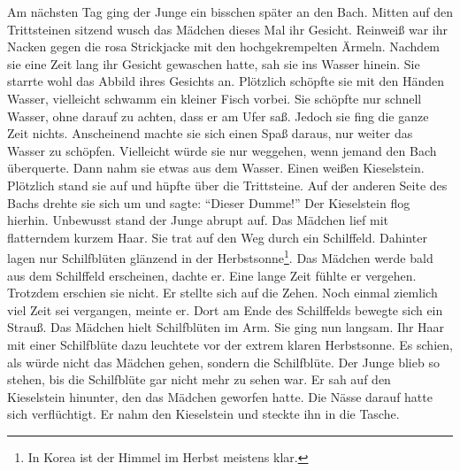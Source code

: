 \documentclass[prd,12pt,tightenlines,notitlepage,nofootinbib]{revtex4-1}
\begin{document}
Am nächsten Tag ging der Junge ein bisschen später an den Bach.
Mitten auf den Trittsteinen sitzend wusch das Mädchen dieses Mal ihr
Gesicht.  Reinweiß war ihr Nacken gegen die rosa
Strickjacke mit den hochgekrempelten Ärmeln.  Nachdem sie eine Zeit lang
ihr Gesicht gewaschen hatte, sah sie ins Wasser hinein.  Sie starrte wohl das
Abbild ihres Gesichts an.  Plötzlich schöpfte sie mit den Händen
Wasser, vielleicht schwamm ein kleiner Fisch vorbei.  Sie schöpfte nur schnell
Wasser, ohne darauf zu achten, dass er am Ufer saß.  Jedoch sie fing
die ganze Zeit nichts.  Anscheinend machte sie sich einen Spaß daraus,
nur weiter das Wasser zu schöpfen.  Vielleicht würde sie nur weggehen,
wenn jemand den Bach überquerte.  Dann nahm sie etwas aus dem Wasser.
Einen weißen Kieselstein.  Plötzlich stand sie auf und hüpfte über die
Trittsteine.  Auf der anderen Seite des Bachs drehte sie sich um und
sagte: "`Dieser Dumme!"'  Der Kieselstein flog hierhin.  Unbewusst stand
der Junge abrupt auf.  Das Mädchen lief mit flatterndem kurzem
Haar.  Sie trat auf den Weg durch ein Schilffeld.  Dahinter lagen nur
Schilfblüten glänzend in der Herbstsonne\footnote{In Korea ist
der Himmel im Herbst meistens klar.}.
Das Mädchen werde bald aus dem
Schilffeld erscheinen, dachte er.  Eine lange Zeit fühlte er vergehen.
Trotzdem erschien sie nicht.  Er stellte sich auf die Zehen.  Noch einmal
ziemlich viel Zeit sei vergangen, meinte er.  Dort am Ende des
Schilffelds bewegte sich ein Strauß.  Das Mädchen hielt Schilfblüten
im Arm.  Sie ging nun langsam.  Ihr Haar mit einer Schilfblüte dazu
leuchtete vor der extrem klaren Herbstsonne.  Es schien, als würde
nicht das Mädchen gehen, sondern die Schilfblüte.  Der Junge blieb
so stehen, bis die Schilfblüte gar nicht mehr zu sehen war.  Er sah
auf den Kieselstein hinunter, den das Mädchen geworfen hatte.  Die Nässe darauf
hatte sich verflüchtigt.  Er nahm den Kieselstein und steckte ihn in die
Tasche.
\end{document}
